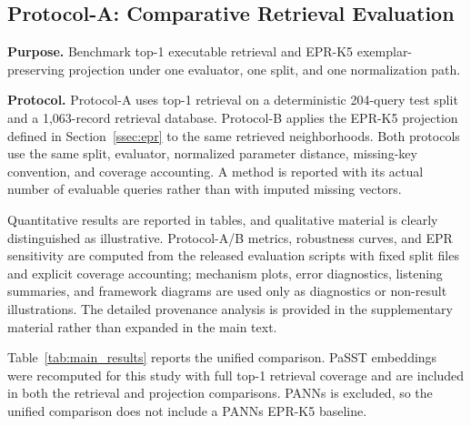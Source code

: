 \subsection{Protocol-A: Comparative Retrieval Evaluation}
\label{ssec:protocolA}

\textbf{Purpose.} Benchmark top-1 executable retrieval and EPR-K5 exemplar-preserving projection under one evaluator, one split, and one normalization path.

\textbf{Protocol.} Protocol-A uses top-1 retrieval on a deterministic 204-query test split and a 1,063-record retrieval database. Protocol-B applies the EPR-K5 projection defined in Section~\ref{ssec:epr} to the same retrieved neighborhoods. Both protocols use the same split, evaluator, normalized parameter distance, missing-key convention, and coverage accounting. A method is reported with its actual number of evaluable queries rather than with imputed missing vectors.

Quantitative results are reported in tables, and qualitative material is clearly distinguished as illustrative. Protocol-A/B metrics, robustness curves, and EPR sensitivity are computed from the released evaluation scripts with fixed split files and explicit coverage accounting; mechanism plots, error diagnostics, listening summaries, and framework diagrams are used only as diagnostics or non-result illustrations. The detailed provenance analysis is provided in the supplementary material rather than expanded in the main text.

Table~\ref{tab:main_results} reports the unified comparison. PaSST embeddings were recomputed for this study with full top-1 retrieval coverage and are included in both the retrieval and projection comparisons. PANNs is excluded, so the unified comparison does not include a PANNs EPR-K5 baseline.

